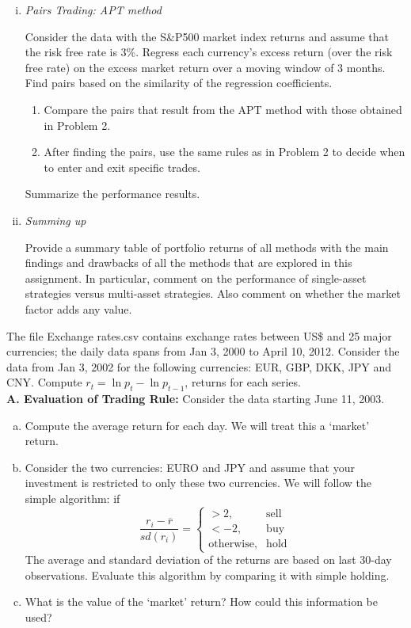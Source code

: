\begin{enumerate}[(i)]
	\item {\it Pairs Trading: APT method}

Consider the data with the S\&P500 market index returns and assume that the risk free rate is 3\%. Regress each currency's excess return (over the risk free rate) on the excess market return over a moving window of 3 months. Find pairs based on the similarity of the regression coefficients.
	\begin{enumerate}
	\item Compare the pairs that result from the APT method with those obtained in Problem 2.
	\item After finding the pairs, use the same rules as in Problem 2 to decide when to enter and exit specific trades.
	\end{enumerate}
Summarize the performance results.

	\item {\it Summing up}

Provide a summary table of portfolio returns of all methods with the main findings and drawbacks of all the methods that are explored in this assignment. In particular, comment on the performance of single-asset strategies versus multi-asset strategies. Also comment on whether the market factor adds any value.
	\end{enumerate}


\prob The file Exchange rates.csv contains exchange rates between US\$ and 25 major currencies; the daily data spans from Jan 3, 2000 to April 10, 2012. Consider the data from Jan 3, 2002 for the following currencies: EUR, GBP, DKK, JPY and CNY. Compute $r_t = \ln{p_t} - \ln{p_{t-1}}$, returns for each series. \\


\indent\textbf{A. Evaluation of Trading Rule:} Consider the data starting June 11, 2003.
	\begin{enumerate}[(a)]
	\item Compute the average return for each day. We will treat this a `market' return.
	\item Consider the two currencies: EURO and JPY and assume that your investment is restricted to only these two currencies. We will follow the simple algorithm: if 
	\[
	\frac{r_i - \overline{r}}{sd(r_i)}=
	\begin{cases}
	>2, & \text{sell} \\
	< -2, & \text{buy} \\
	\text{otherwise}, & \text{hold}
	\end{cases}
	\]
The average and standard deviation of the returns are based on last 30-day observations. Evaluate this algorithm by comparing it with simple holding.
	\item What is the value of the `market' return? How could this information be used?
\end{enumerate}


